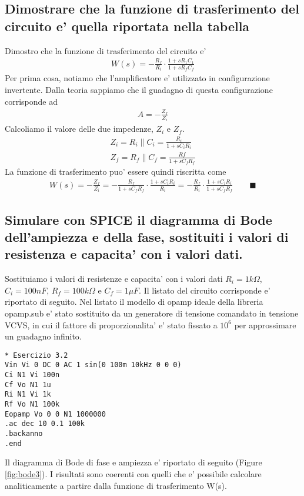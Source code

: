 \documentclass[a4paper,10pt]{article}
\begin{document}
\subsection{Dimostrare che la funzione di trasferimento del circuito e' quella riportata nella tabella}
Dimostro che la funzione di trasferimento del circuito e'
\begin{align*}
W(s) = -\frac{R_f}{R_i} \cdot \frac{1+sR_1C_1}{1+sR_fC_f}
\end{align*}
Per prima cosa, notiamo che l'amplificatore e' utilizzato in configurazione invertente. Dalla teoria sappiamo che il guadagno di questa configurazione corrisponde ad
\begin{align*}
A = -\frac{Z_f}{Z_i}
\end{align*}
Calcoliamo il valore delle due impedenze, $Z_i$ e $Z_f$.
\begin{gather*}
Z_i = R_i \parallel C_i = \frac{R_i}{1+sC_iR_i} \\
Z_f = R_f \parallel C_f = \frac{Rf}{1+sC_fR_f}
\end{gather*}
La funzione di trasferimento puo' essere quindi riscritta come
\begin{align*}
W(s) = -\frac{Z_f}{Z_i} = -\frac{R_f}{1+sC_fR_f} \cdot \frac{1+sC_iR_i}{R_i} = -\frac{R_f}{R_i} \cdot \frac{1+sC_iR_i}{1+sC_fR_f}\qquad  \blacksquare
\end{align*}
\pagebreak

\subsection{Simulare con SPICE il diagramma di Bode dell'ampiezza e della fase, sostituiti i valori di resistenza e capacita' con i valori dati.}
Sostituiamo i valori di resistenze e capacita' con i valori dati $R_i=1k\Omega$, $C_i=100nF$, $R_f=100k\Omega$ e $C_f=1 \mu F$. Il listato del circuito corrisponde e' riportato di seguito. Nel listato il modello di opamp ideale della libreria opamp.sub e' stato sostituito da un generatore di tensione comandato in tensione VCVS, in cui il fattore di proporzionalita' e' stato fissato a $10^6$ per approssimare un guadagno infinito.
\begin{verbatim}
* Esercizio 3.2
Vin Vi 0 DC 0 AC 1 sin(0 100m 10kHz 0 0 0)
Ci N1 Vi 100n
Cf Vo N1 1u
Ri N1 Vi 1k
Rf Vo N1 100k
Eopamp Vo 0 0 N1 1000000
.ac dec 10 0.1 100k
.backanno
.end
\end{verbatim}    	
Il diagramma di Bode di fase e ampiezza e' riportato di seguito (Figure \ref{fig:bode3}). I risultati sono coerenti con quelli che e' possibile calcolare analiticamente a partire dalla funzione di trasferimento W(s). 
\end{document}
